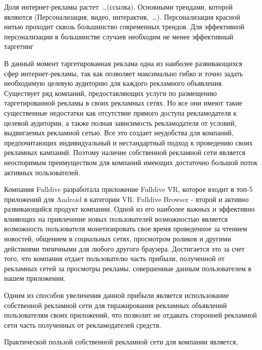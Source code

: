 \documentclass[times]{itmo-student-thesis}
\begin{document}
\tableofcontents









\startprefacepage

Доля интернет-рекламы растет …(ссылка). Основными трендами, которой являются (Персонализация, видео, интерактив, …). Персонализация красной нитью проходит сквозь большинство современных трендов. Для эффективной персонализации в большинстве случаев необходим не менее эффективный таргетинг

В данный момент таргетированная реклама одна из наиболее развивающихся сфер интернет-рекламы, так как позволяет максимально гибко и точно задать необходимую целевую аудиторию для каждого рекламного объявления. Существует ряд компаний, предоставляющих услуги по размещению таргетированной рекламы в своих рекламных сетях. Но все они имеют такие существенные недостатки как отсутствие прямого доступа рекламодателя к целевой аудитории, а также полная зависимость рекламодателя от условий, выдвигаемых рекламной сетью. Все это создает неудобства для компаний, предпочитающих индивидуальный и нестандартный подход к проведению своих рекламных кампаний. Поэтому наличие собственной рекламной сети является неоспоримым преимуществом для компаний имеющих достаточно большой поток активных пользователей.

Компания Fulldive разработала приложение Fulldive VR, которое входит в топ-5 приложений для Android в категории VR. Fulldive Browser - второй и активно развивающийся продукт компании. Одной из его наиболее важных и эффективно влияющих на привлечение новых пользователей возможностью является возможность пользователя монетизировать свое время проведенное за чтением новостей, общением в социальных сетях, просмотром роликов и другими действиями типичными для любого другого браузера. Достигается это за счет того, что компания отдает пользователю часть прибыли, полученной от рекламных сетей за просмотры рекламы, совершенные данным пользователем в нашем приложении. 

Одним из способов увеличения данной прибыли является использование собственной рекламной сети для тиражирования рекламных объявлений пользователям своих приложений, что позволит не отдавать сторонней рекламной сети часть полученных от рекламодателей средств.

Практической пользой собственной рекламной сети для компании является, 
\end{document}
